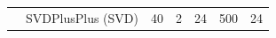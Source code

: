 \begin{table}[t]
{\begin{tabular}{p{0.01cm}l|ccccc}
      &
                                                                       SVDPlusPlus (SVD)
                                                                       &
                                                                       40
                                                                       &
                                                                       2
                                                                       &
                                                                       24
                                                                       &
                                                                       500
                                                                       &
                                                                       24
                                                                       \\


\end{tabular}}
\end{table}
